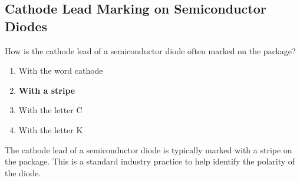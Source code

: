 \subsection{Cathode Lead Marking on Semiconductor Diodes}
\label{T6B06}

\begin{tcolorbox}[colback=gray!10!white,colframe=black!75!black,title=T6B06]
How is the cathode lead of a semiconductor diode often marked on the package?
\begin{enumerate}[noitemsep]
    \item With the word cathode
    \item \textbf{With a stripe}
    \item With the letter C
    \item With the letter K
\end{enumerate}
\end{tcolorbox}

The cathode lead of a semiconductor diode is typically marked with a stripe on the package. This is a standard industry practice to help identify the polarity of the diode.